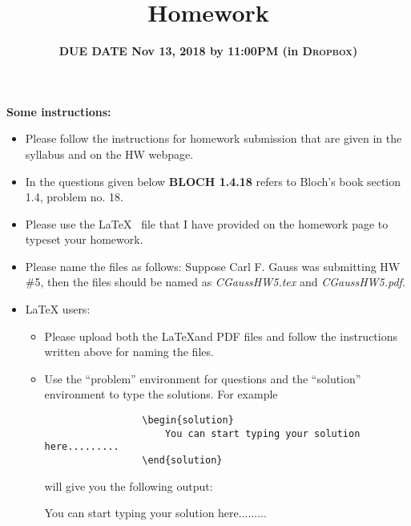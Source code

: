 \documentclass[11pt]{article}
\title{\textbf{\mycourse} \hfill Homework \hwnumber \hfill \textbf{\semesteryear}} %
\author{\myname} %
\date{ \textbf{DUE DATE Nov 13, 2018 {\red by 11:00PM (in \textsc{Dropbox})}}} %
\newcommand{\hwnumber}{5} %
\begin{document}
\thispagestyle{empty} %
\renewcommand{\arraystretch}{1} %

\clearpage %
\textbf{Some instructions:}
\begin{itemize}
    \item Please follow the instructions for homework submission that are given in the syllabus and on the HW webpage.
    \item In the questions given below \textsf{\bf BLOCH 1.4.18} refers to Bloch's book section 1.4, problem no. 18.
    \item Please use the \LaTeX~ file that I have provided on the homework page to typeset your homework.
    \item Please name the files as follows: Suppose Carl F. Gauss was submitting HW \#\hwnumber, then the files should be named as \textit{CGaussHW\hwnumber.tex} and \textit{CGaussHW\hwnumber.pdf}.
    \item \LaTeX{} users:
       \begin{itemize}
            \item Please upload both the \LaTeX and PDF files and follow the instructions written above for naming the files.
            \item Use the {\blue ``problem'' environment} for questions and the {\blue ``solution'' environment} to type the solutions. For example
            {\magenta
            \begin{verbatim}
                 \begin{solution}
                     You can start typing your solution here.........
                 \end{solution}
            \end{verbatim}
            }
             will give you the following output:

                \begin{solution}
                You can start typing your solution here.........
                \end{solution}


\end{itemize}
\end{itemize}
\end{document}
